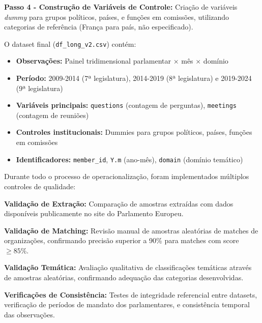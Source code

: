 \textbf{Passo 4 - Construção de Variáveis de Controle:} Criação de variáveis \textit{dummy} para grupos políticos, países, e funções em comissões, utilizando categorias de referência (França para país, não especificado).

O dataset final (\texttt{df\_long\_v2.csv}) contém:
\begin{itemize}
    \item \textbf{Observações:} Painel tridimensional parlamentar × mês × domínio
    \item \textbf{Período:} 2009-2014 (7ª legislatura), 2014-2019 (8ª legislatura) e 2019-2024 (9ª legislatura)
    \item \textbf{Variáveis principais:} \texttt{questions} (contagem de perguntas), \texttt{meetings} (contagem de reuniões)
    \item \textbf{Controles institucionais:} Dummies para grupos políticos, países, funções em comissões
    \item \textbf{Identificadores:} \texttt{member\_id}, \texttt{Y.m} (ano-mês), \texttt{domain} (domínio temático)
\end{itemize}


Durante todo o processo de operacionalização, foram implementados múltiplos controles de qualidade:

\textbf{Validação de Extração:} Comparação de amostras extraídas com dados disponíveis publicamente no site do Parlamento Europeu.

\textbf{Validação de Matching:} Revisão manual de amostras aleatórias de matches de organizações, confirmando precisão superior a 90\% para matches com score $\geq 85\%$.

\textbf{Validação Temática:} Avaliação qualitativa de classificações temáticas através de amostras aleatórias, confirmando adequação das categorias desenvolvidas.

\textbf{Verificações de Consistência:} Testes de integridade referencial entre datasets, verificação de períodos de mandato dos parlamentares, e consistência temporal das observações.
